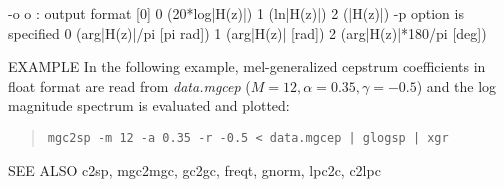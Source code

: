 \begin{options}
       -o o  : output format                       [0]
                 0 (20*log|H(z)|)
                 1 (ln|H(z)|)
                 2 (|H(z)|)
             -p option is specified
                 0 (arg|H(z)|/pi     [pi rad])
                 1 (arg|H(z)|        [rad])
                 2 (arg|H(z)|*180/pi [deg])


\end{options}

\begin{qsection}{EXAMPLE}
In the following example, mel-generalized cepstrum coefficients
in float format are read from {\em data.mgcep}
($M=12, \alpha=0.35, \gamma=-0.5$)
and the log magnitude spectrum is evaluated and plotted:
\begin{quote}
 \verb!mgc2sp -m 12 -a 0.35 -r -0.5 < data.mgcep | glogsp | xgr!
\end{quote} 
\end{qsection}

\begin{qsection}{SEE ALSO}
c2sp, mgc2mgc, gc2gc, freqt, gnorm, lpc2c, c2lpc
\end{qsection}

